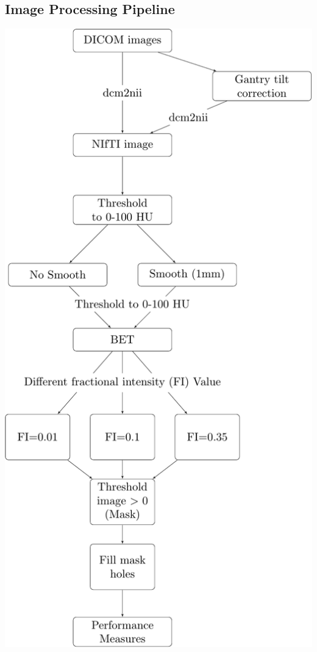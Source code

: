 \documentclass[final]{beamer}\usepackage[]{graphicx}\usepackage[]{color}
\begin{document}
\begin{frame}[fragile]
\begin{minipage}{0.2\linewidth}
\section{Image Processing Pipeline}
\includegraphics[width=\linewidth]{Imaging_Pipeline_Flowchart.pdf}

\end{minipage}
\end{frame}
\end{document}
